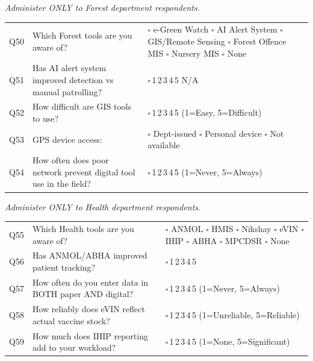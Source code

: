 \documentclass[10pt,a4paper]{article}
\newcommand{\likert}{{\Large$\square$}\,1\quad{\Large$\square$}\,2\quad{\Large$\square$}\,3\quad{\Large$\square$}\,4\quad{\Large$\square$}\,5}
\begin{document}
\vspace{3pt}
\vspace{4pt}

\small\textit{Administer ONLY to Forest department respondents.}\vspace{3pt}

\noindent\begin{tabularx}{\textwidth}{@{}L{0.5cm} X L{5.5cm}@{}}
Q50 & Which Forest tools are you aware of? & {\Large$\square$} e-Green Watch {\Large$\square$} AI Alert System {\Large$\square$} GIS/Remote Sensing {\Large$\square$} Forest Offence MIS {\Large$\square$} Nursery MIS {\Large$\square$} None \\[3pt]
Q51 & Has AI alert system improved detection vs manual patrolling? & \likert{}\quad{\Large$\square$} N/A \\[3pt]
Q52 & How difficult are GIS tools to use? & \likert{} {\scriptsize(1=Easy, 5=Difficult)} \\[3pt]
Q53 & GPS device access: & {\Large$\square$} Dept-issued {\Large$\square$} Personal device {\Large$\square$} Not available \\[3pt]
Q54 & How often does poor network prevent digital tool use in the field? & \likert{} {\scriptsize(1=Never, 5=Always)} \\
\end{tabularx}

\vspace{3pt}
\vspace{4pt}

\small\textit{Administer ONLY to Health department respondents.}\vspace{3pt}

\noindent\begin{tabularx}{\textwidth}{@{}L{0.5cm} X L{5.5cm}@{}}
Q55 & Which Health tools are you aware of? & {\Large$\square$} ANMOL {\Large$\square$} HMIS {\Large$\square$} Nikshay {\Large$\square$} eVIN {\Large$\square$} IHIP {\Large$\square$} ABHA {\Large$\square$} MPCDSR {\Large$\square$} None \\[3pt]
Q56 & Has ANMOL/ABHA improved patient tracking? & \likert \\[3pt]
Q57 & How often do you enter data in BOTH paper AND digital? & \likert{} {\scriptsize(1=Never, 5=Always)} \\[3pt]
Q58 & How reliably does eVIN reflect actual vaccine stock? & \likert{} {\scriptsize(1=Unreliable, 5=Reliable)} \\[3pt]
Q59 & How much does IHIP reporting add to your workload? & \likert{} {\scriptsize(1=None, 5=Significant)} \\
\end{tabularx}
\end{document}

